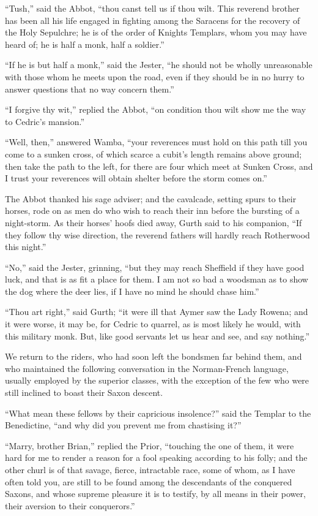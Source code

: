 ``Tush,'' said the Abbot, ``thou canst tell us if thou wilt. This
reverend brother has been all his life engaged in fighting among the
Saracens for the recovery of the Holy Sepulchre; he is of the order of
Knights Templars, whom you may have heard of; he is half a monk, half a
soldier.''

``If he is but half a monk,'' said the Jester, ``he should not be wholly
unreasonable with those whom he meets upon the road, even if they should
be in no hurry to answer questions that no way concern them.''

``I forgive thy wit,'' replied the Abbot, ``on condition thou wilt show
me the way to Cedric's mansion.''

``Well, then,'' answered Wamba, ``your reverences must hold on this path
till you come to a sunken cross, of which scarce a cubit's length
remains above ground; then take the path to the left, for there are four
which meet at Sunken Cross, and I trust your reverences will obtain
shelter before the storm comes on.''

The Abbot thanked his sage adviser; and the cavalcade, setting spurs to
their horses, rode on as men do who wish to reach their inn before the
bursting of a night-storm. As their horses' hoofs died away, Gurth said
to his companion, ``If they follow thy wise direction, the reverend
fathers will hardly reach Rotherwood this night.''

``No,'' said the Jester, grinning, ``but they may reach Sheffield if
they have good luck, and that is as fit a place for them. I am not so
bad a woodsman as to show the dog where the deer lies, if I have no mind
he should chase him.''

``Thou art right,'' said Gurth; ``it were ill that Aymer saw the Lady
Rowena; and it were worse, it may be, for Cedric to quarrel, as is most
likely he would, with this military monk. But, like good servants let us
hear and see, and say nothing.''

We return to the riders, who had soon left the bondsmen far behind them,
and who maintained the following conversation in the Norman-French
language, usually employed by the superior classes, with the exception
of the few who were still inclined to boast their Saxon descent.

``What mean these fellows by their capricious insolence?'' said the
Templar to the Benedictine, ``and why did you prevent me from chastising
it?''

``Marry, brother Brian,'' replied the Prior, ``touching the one of them,
it were hard for me to render a reason for a fool speaking according to
his folly; and the other churl is of that savage, fierce, intractable
race, some of whom, as I have often told you, are still to be found
among the descendants of the conquered Saxons, and whose supreme
pleasure it is to testify, by all means in their power, their aversion
to their conquerors.''

